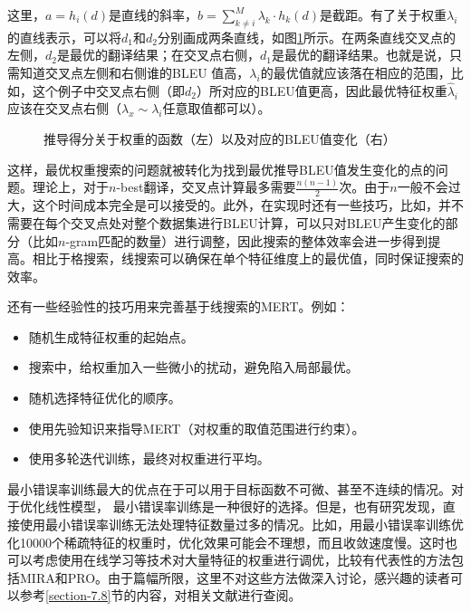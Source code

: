 \parinterval 这里，$a = h_i(d)$是直线的斜率，$b = \sum_{k \neq i}^{M} \lambda_k \cdot h_k (d)$是截距。有了关于权重$\lambda_i$的直线表示，可以将$d_1$和$d_2$分别画成两条直线，如图\ref{fig:7-25}所示。在两条直线交叉点的左侧，$d_2$是最优的翻译结果；在交叉点右侧，$d_1$是最优的翻译结果。也就是说，只需知道交叉点左侧和右侧谁的BLEU 值高，$\lambda_i$的最优值就应该落在相应的范围，比如，这个例子中交叉点右侧（即$d_2$）所对应的BLEU值更高，因此最优特征权重$\hat{\lambda}_i$应该在交叉点右侧（$\lambda_x \sim \lambda_i$任意取值都可以）。

\begin{figure}[htp]
\centering

\caption{推导得分关于权重的函数（左）以及对应的BLEU值变化（右）}
\label{fig:7-25}
\end{figure}

\parinterval 这样，最优权重搜索的问题就被转化为找到最优推导BLEU值发生变化的点的问题。理论上，对于$n$-best翻译，交叉点计算最多需要$\frac{n(n-1)}{2}$次。由于$n$一般不会过大，这个时间成本完全是可以接受的。此外，在实现时还有一些技巧，比如，并不需要在每个交叉点处对整个数据集进行BLEU计算，可以只对BLEU产生变化的部分（比如$n$-gram匹配的数量）进行调整，因此搜索的整体效率会进一步得到提高。相比于格搜索，线搜索可以确保在单个特征维度上的最优值，同时保证搜索的效率。

\parinterval 还有一些经验性的技巧用来完善基于线搜索的MERT。例如：

\begin{itemize}
\vspace{0.5em}
\item 随机生成特征权重的起始点。
\vspace{0.5em}
\item 搜索中，给权重加入一些微小的扰动，避免陷入局部最优。
\vspace{0.5em}
\item 随机选择特征优化的顺序。
\vspace{0.5em}
\item 使用先验知识来指导MERT（对权重的取值范围进行约束）。
\vspace{0.5em}
\item 使用多轮迭代训练，最终对权重进行平均。
\vspace{0.5em}
\end{itemize}

\parinterval 最小错误率训练最大的优点在于可以用于目标函数不可微、甚至不连续的情况。对于优化线性模型， 最小错误率训练是一种很好的选择。但是，也有研究发现，直接使用最小错误率训练无法处理特征数量过多的情况。比如，用最小错误率训练优化10000个稀疏特征的权重时，优化效果可能会不理想，而且收敛速度慢。这时也可以考虑使用在线学习等技术对大量特征的权重进行调优，比较有代表性的方法包括MIRA和PRO。由于篇幅所限，这里不对这些方法做深入讨论，感兴趣的读者可以参考\ref{section-7.8}节的内容，对相关文献进行查阅。

